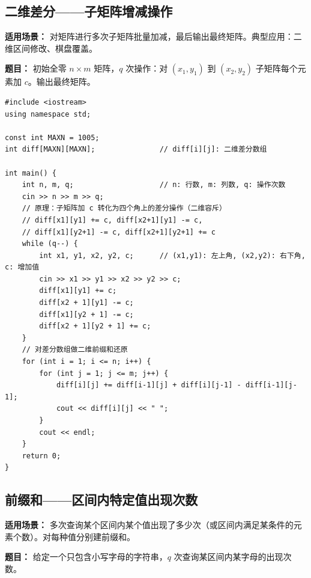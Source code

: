 \documentclass[12pt,a4paper]{ctexart}
\begin{document}
\subsection{二维差分——子矩阵增减操作}
\textbf{适用场景：} 对矩阵进行多次子矩阵批量加减，最后输出最终矩阵。典型应用：二维区间修改、棋盘覆盖。

\textbf{题目：} 初始全零 $n\times m$ 矩阵，$q$ 次操作：对 $(x_1,y_1)$ 到 $(x_2,y_2)$ 子矩阵每个元素加 $c$。输出最终矩阵。

\begin{lstlisting}[caption={二维差分——O(1) 子矩阵增减}]
#include <iostream>
using namespace std;

const int MAXN = 1005;
int diff[MAXN][MAXN];               // diff[i][j]: 二维差分数组

int main() {
    int n, m, q;                    // n: 行数, m: 列数, q: 操作次数
    cin >> n >> m >> q;
    // 原理：子矩阵加 c 转化为四个角上的差分操作（二维容斥）
    // diff[x1][y1] += c, diff[x2+1][y1] -= c,
    // diff[x1][y2+1] -= c, diff[x2+1][y2+1] += c
    while (q--) {
        int x1, y1, x2, y2, c;      // (x1,y1): 左上角, (x2,y2): 右下角, c: 增加值
        cin >> x1 >> y1 >> x2 >> y2 >> c;
        diff[x1][y1] += c;
        diff[x2 + 1][y1] -= c;
        diff[x1][y2 + 1] -= c;
        diff[x2 + 1][y2 + 1] += c;
    }
    // 对差分数组做二维前缀和还原
    for (int i = 1; i <= n; i++) {
        for (int j = 1; j <= m; j++) {
            diff[i][j] += diff[i-1][j] + diff[i][j-1] - diff[i-1][j-1];
            cout << diff[i][j] << " ";
        }
        cout << endl;
    }
    return 0;
}
\end{lstlisting}

\subsection{前缀和——区间内特定值出现次数}
\textbf{适用场景：} 多次查询某个区间内某个值出现了多少次（或区间内满足某条件的元素个数）。对每种值分别建前缀和。

\textbf{题目：} 给定一个只包含小写字母的字符串，$q$ 次查询某区间内某字母的出现次数。
\end{document}

